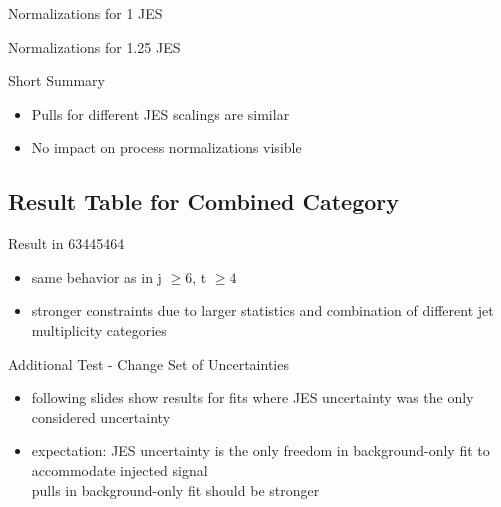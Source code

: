 \begin{frame}{Normalizations for \num{1} JES}
\begin{scriptsize}

\end{scriptsize}
\end{frame}

\begin{frame}{Normalizations for \num{1.25} JES}
\begin{scriptsize}

\end{scriptsize}
\end{frame}

\begin{frame}{Short Summary}
\begin{itemize}
\item Pulls for different JES scalings are similar
\item No impact on process normalizations visible
\end{itemize}
\end{frame}

\subsection{Result Table for Combined Category}
\begin{frame}{Result in 63445464}

\begin{itemize}
\item same behavior as in j $\geq 6$, t $\geq 4$
\item stronger constraints due to larger statistics and combination of different jet multiplicity categories
\end{itemize}
\end{frame}

\begin{frame}{Additional Test - Change Set of Uncertainties}
\begin{itemize}
\item following slides show results for fits where JES uncertainty was the only considered uncertainty
\item expectation: JES uncertainty is the only freedom in background-only fit to accommodate injected signal\\
\rar pulls in background-only fit should be stronger
\end{itemize}
\end{frame}

